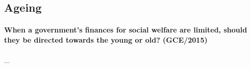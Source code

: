 \documentclass[../../main]{subfiles}
\begin{document}
\subsection{Ageing}

\paragraph{When a government's finances for social welfare are limited, should they be directed towards the young or old? (GCE/2015)} \_
\end{document}
